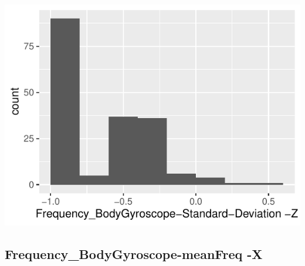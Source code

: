 \documentclass[
]{article}
\begin{document}
\begin{minipage}{0.25 \textwidth}

\includegraphics{codebook_tidydatasub_files/figure-latex/Var-66-Frequency-BodyGyroscope-Standard-Deviation--Z-1.pdf}

\end{minipage}

\noindent\makebox[\linewidth]{\rule{\textwidth}{0.4pt}}

\hypertarget{frequency_bodygyroscope-meanfreq--x}{%
\subsection{Frequency\_BodyGyroscope-meanFreq
-X}\label{frequency_bodygyroscope-meanfreq--x}}
\end{document}
